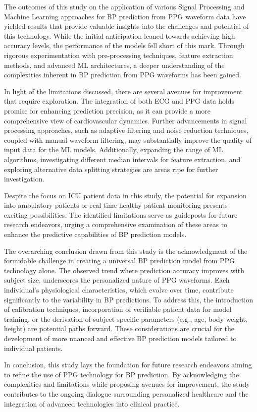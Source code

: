 The outcomes of this study on the application of various Signal Processing and Machine Learning approaches for BP prediction from PPG waveform data have yielded results
that provide valuable insights into the challenges and potential of this technology.
While the initial anticipation leaned towards achieving high accuracy levels, the performance of the models fell short of this mark.
Through rigorous experimentation with pre-processing techniques, feature extraction methods, and advanced ML architectures,
a deeper understanding of the complexities inherent in BP prediction from PPG waveforms has been gained.

In light of the limitations discussed, there are several avenues for improvement that require exploration.
The integration of both ECG and PPG data holds promise for enhancing prediction precision, as it can provide a more comprehensive view of cardiovascular dynamics.
Further advancements in signal processing approaches, such as adaptive filtering and noise reduction techniques, coupled with manual waveform filtering,
may substantially improve the quality of input data for the ML models.
Additionally, expanding the range of ML algorithms, investigating different median intervals for feature extraction,
and exploring alternative data splitting strategies are areas ripe for further investigation.

Despite the focus on ICU patient data in this study, the potential for expansion into ambulatory patients or real-time healthy patient monitoring presents exciting possibilities.
The identified limitations serve as guideposts for future research endeavors, urging a comprehensive examination of these areas to enhance the predictive capabilities of BP prediction models.

The overarching conclusion drawn from this study is the acknowledgment of the formidable challenge in creating a universal BP prediction model from PPG technology alone.
The observed trend where prediction accuracy improves with subject size, underscores the personalized nature of PPG waveforms.
Each individual's physiological characteristics, which evolve over time, contribute significantly to the variability in BP predictions.
To address this, the introduction of calibration techniques, incorporation of verifiable patient data for model training,
or the derivation of subject-specific parameters (e.g., age, body weight, height) are potential paths forward.
These considerations are crucial for the development of more nuanced and effective BP prediction models tailored to individual patients.

In conclusion, this study lays the foundation for future research endeavors aiming to refine the use of PPG technology for BP prediction.
By acknowledging the complexities and limitations while proposing avenues for improvement,
the study contributes to the ongoing dialogue surrounding personalized healthcare and the integration of advanced technologies into clinical practice.
